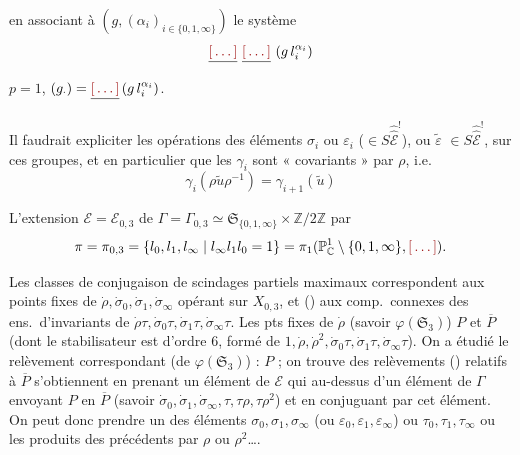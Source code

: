 \documentclass[11pt,a4paper]{article}
\begin{document}
en associant à $(g, (\alpha_i)_{i \in \{0,1,\infty\}})$ le système
\[
\struck{\ill{}}\ \struck{\ill{}}\ (g\, l_i^{\alpha_i})
\]
 $p = 1$, $(g_\cdot) = \struck{\ill{}}\,(g\, l_i^{\alpha_i})$.

Il faudrait expliciter les opérations des éléments $\sigma_i$ ou
$\varepsilon_i$ ($\in S\hat{\hat{\mathcal{E}}}^{!}$), ou $\tilde\varepsilon$
\ill{} $\in S\hat{\hat{\mathcal{E}}}^{!}$, sur ces groupes, et en particulier
\ill{} que \struck{\ill{}} les $\gamma_i$ sont « covariants » par $\rho$,
i.e.
\[
\gamma_i(\rho\tilde u\rho^{-1}) = \gamma_{i+1}(\tilde u)
\]


L'extension $\mathcal{E} = \mathcal{E}_{0,3}$ de $\Gamma = \Gamma_{0,3} \simeq
\mathfrak{S}_{\{0,1,\infty\}} \times \mathbb{Z}/2\mathbb{Z}$ par
\[
\pi = \pi_{0,3} = \{ l_0, l_1, l_\infty \mid l_\infty l_1 l_0 = 1 \}
= \pi_1(\mathbb{P}^1_{\mathbb{C}} \setminus \{0,1,\infty\}, \ill{}) .
\]

Les classes de conjugaison  de scindages partiels
maximaux correspondent aux points fixes de $\dot\rho, \dot\sigma_0,
\dot\sigma_1, \dot\sigma_\infty$ opérant sur $X_{0,3}$, et
() aux comp.\ connexes des ens.\ d'invariants de
$\dot\rho\tau, \dot\sigma_0\tau, \dot\sigma_1\tau, \dot\sigma_\infty\tau$. Les
pts fixes de $\dot\rho$  (savoir $\varphi(\mathfrak{S}_3)$)
$P$ et $\overline{P}$ (dont le stabilisateur est d'ordre 6, formé de $1,
\dot\rho, \dot\rho^2, \dot\sigma_0\tau, \dot\sigma_1\tau,
\dot\sigma_\infty\tau$). On a étudié le relèvement correspondant (de
$\varphi(\mathfrak{S}_3)$) : $P$ ; on trouve  des
relèvements () relatifs à $\overline{P}$
s'obtiennent en  prenant un élément de $\mathcal{E}$
\struck{\ill{}} qui  au-dessus d'un élément de $\Gamma$
envoyant $P$ en $\overline{P}$ (savoir $\dot\sigma_0, \dot\sigma_1,
\dot\sigma_\infty, \tau, \tau\rho, \tau\rho^2$) et en conjuguant par cet
élément. On peut donc prendre \struck{\ill{}} un des éléments $\sigma_0,
\sigma_1, \sigma_\infty$ (ou $\varepsilon_0, \varepsilon_1,
\varepsilon_\infty$) ou $\tau_0, \tau_1, \tau_\infty$ ou \struck{\ill{}} les
produits des précédents par \struck{\ill{}} $\rho$ ou $\rho^2$….
\end{document}
